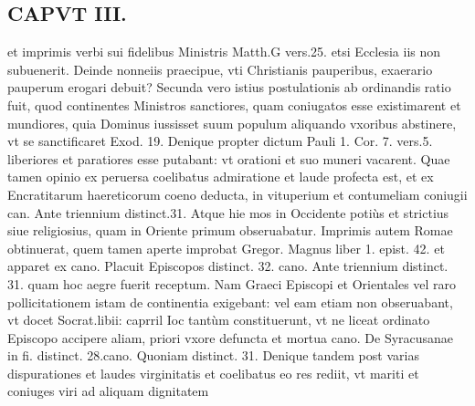 \documentclass{article}
\begin{document}
\begin{pages}
\section*{CAPVT  III. }
\marginpar{[ p.115 ]}\pstart et imprimis verbi sui fidelibus Ministris Matth.G vers.25. etsi Ecclesia iis non subuenerit. Deinde nonneiis praecipue, vti Christianis pauperibus, exaerario pauperum erogari debuit?  \pend\pstart Secunda vero istius postulationis ab ordinandis ratio fuit, quod continentes Ministros sanctiores, quam coniugatos esse existimarent et mundiores, quia Dominus iussisset suum populum aliquando vxoribus abstinere, vt se sanctificaret Exod. 19. Denique propter dictum Pauli 1. Cor. 7. vers.5. liberiores et paratiores esse putabant: vt orationi et suo muneri vacarent. Quae tamen opinio ex peruersa coelibatus admiratione et laude profecta est, et ex Encratitarum haereticorum coeno deducta, in vituperium et contumeliam coniugii can. Ante triennium distinct.31.  \pend\pstart Atque hie mos in Occidente potiùs et strictius siue religiosius, quam in Oriente primum obseruabatur. Imprimis autem Romae obtinuerat, quem tamen aperte improbat Gregor. Magnus liber 1. epist. 42. et apparet ex cano. Placuit Episcopos distinct. 32. cano. Ante triennium distinct. 31. quam hoc aegre fuerit receptum. Nam Graeci Episcopi et Orientales vel raro pollicitationem istam de continentia exigebant: vel eam etiam non obseruabant, vt docet Socrat.libii: caprril Ioc tantùm constituerunt, vt ne liceat ordinato Episcopo accipere aliam, priori vxore defuncta et mortua cano. De Syracusanae in fi. distinct. 28.cano. Quoniam distinct. 31.  \pend\pstart Denique tandem post varias dispurationes et laudes virginitatis et coelibatus eo res rediit, vt mariti et coniuges viri ad aliquam dignitatem  \pend

\end{pages}
\end{document}
